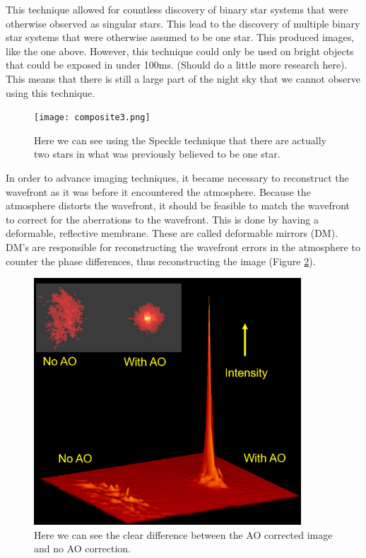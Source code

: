 This technique allowed for countless discovery of binary star systems that were
otherwise observed as singular stars.  This lead to the discovery of multiple binary
star systems that were otherwise assumed to be one star.  This produced images, like
the one above.  However, this technique could only be used on bright objects that
could be exposed in under 100ms.  (Should do a little more research here).  This
means that there is still a large part of the night sky that we cannot observe using
this technique.

\begin{figure}[h!]
\centering
\texttt{[image: composite3.png]}
\caption{Here we can see using the Speckle technique that there are actually two stars in what was previously believed to be one star.}
\label{fig:speckle}
\end{figure}


In order to advance imaging techniques, it became necessary to reconstruct the
wavefront as it was before it encountered the atmosphere. Because the atmosphere distorts the
wavefront, it should be feasible to match the wavefront to correct for the
aberrations to the wavefront.  This is done by having a deformable, reflective
membrane.  These are called deformable mirrors (DM). DM's are responsible for
reconstructing the wavefront errors in the atmosphere to counter the phase
differences, thus reconstructing the image (Figure \ref{fig:AO_no_AO}).

\begin{figure}[h!]
\centering
\includegraphics[width=10cm]{Figures/AO_vs_no_AO.png}
\caption{Here we can see the clear difference between the AO corrected image and no AO correction.}
\label{fig:AO_no_AO}
\end{figure}


